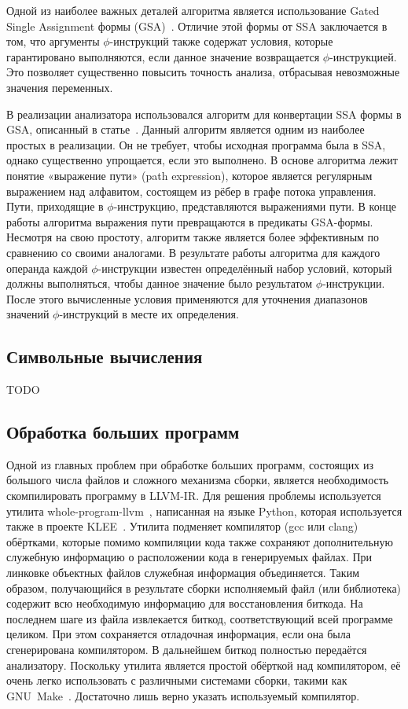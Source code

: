 Одной из наиболее важных деталей алгоритма является использование
Gated Single Assignment формы
(GSA)~\cite{ottenstein1990program}. Отличие этой формы от SSA
заключается в том, что аргументы $\phi$-инструкций также содержат
условия, которые гарантировано выполняются, если данное значение
возвращается $\phi$-инструкцией. Это позволяет существенно повысить
точность анализа, отбрасывая невозможные значения переменных.

В реализации анализатора использовался алгоритм для конвертации SSA
формы в GSA, описанный в статье~\cite{tu1995efficient}. Данный
алгоритм является одним из наиболее простых в реализации. Он не
требует, чтобы исходная программа была в SSA, однако существенно
упрощается, если это выполнено. В основе алгоритма лежит понятие
«выражение пути» (path expression), которое является регулярным
выражением над алфавитом, состоящем из рёбер в графе потока
управления. Пути, приходящие в $\phi$-инструкцию, представляются
выражениями пути. В конце работы алгоритма выражения пути превращаются
в предикаты GSA-формы. Несмотря на свою простоту, алгоритм также
является более эффективным по сравнению со своими аналогами. В
результате работы алгоритма для каждого операнда каждой
$\phi$-инструкции известен определённый набор условий, который должны
выполняться, чтобы данное значение было результатом
$\phi$-инструкции. После этого вычисленные условия применяются для
уточнения диапазонов значений $\phi$-инструкций в месте их определения.

\subsection{Символьные вычисления}

TODO

\subsection{Обработка больших программ}

Одной из главных проблем при обработке больших программ, состоящих из
большого числа файлов и сложного механизма сборки, является
необходимость скомпилировать программу в LLVM-IR. Для решения проблемы
используется утилита whole-program-llvm~\cite{wllvm}, написанная на
языке Python, которая используется также в проекте
KLEE~\cite{cadar2008klee}. Утилита подменяет компилятор (gcc или
clang) обёртками, которые помимо компиляции кода также сохраняют
дополнительную служебную информацию о расположении кода в генерируемых
файлах. При линковке объектных файлов служебная информация
объединяется. Таким образом, получающийся в результате сборки
исполняемый файл (или библиотека) содержит всю необходимую информацию
для восстановления биткода. На последнем шаге из файла извлекается
биткод, соответствующий всей программе целиком. При этом сохраняется
отладочная информация, если она была сгенерирована компилятором. В
дальнейшем биткод полностью передаётся анализатору. Поскольку утилита
является простой обёрткой над компилятором, её очень легко
использовать с различными системами сборки, такими как
GNU~Make~\cite{gnumake}. Достаточно лишь верно указать используемый
компилятор.

